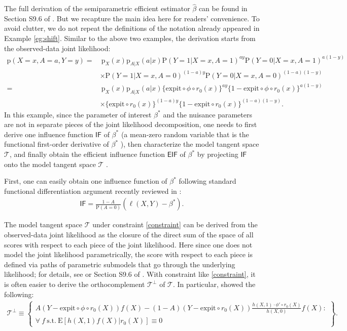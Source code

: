\documentclass{article}
\def\IIF{\mathsf{IF}}
\def\expit{\mathrm{expit}}
\theoremstyle{plain}
\theoremstyle{definition}
\theoremstyle{remark}
\def\P{\mathrm{P}}
\def\E{\mathrm{E}}
\def\hat{\widehat}
\def\p{\mathrm{p}}
\def\st{\mathrm{s.t.}}
\begin{document}
The full derivation of the semiparametric efficient estimator $\hat{\beta}$ can be found in Section S9.6 of \citet{qiu2023efficient}. But we recapture the main idea here for readers' convenience. To avoid clutter, we do not repeat the definitions of the notation already appeared in Example \ref{eg:shift}. Similar to the above two examples, the derivation starts from the observed-data joint likelihood:
\begin{align*}
\p (X = x, A = a, Y = y) = & \ \p_{X} (x) \p_{A | X} (a | x) \P (Y = 1 | X = x, A = 1)^{a y} \P (Y = 0 | X = x, A = 1)^{a (1 - y)} \\
& \times \P (Y = 1 | X = x, A = 0)^{(1 - a) y} \P (Y = 0 | X = x, A = 0)^{(1 - a) (1 - y)} \\
= & \ \p_{X} (x) \p_{A | X} (a | x) \{\expit \circ \phi \circ r_{0} (x)\}^{a y} \{1 - \expit \circ \phi \circ r_{0} (x)\}^{a (1 - y)} \\
& \times \{\expit \circ r_{0} (x)\}^{(1 - a) y} \{1 - \expit \circ r_{0} (x)\}^{(1 - a) (1 - y)}.
\end{align*}
In this example, since the parameter of interest $\beta^\ast$ and the nuisance parameters are not in separate pieces of the joint likelihood decomposition, one needs to first derive one influence function $\mathsf{IF}$ of $\beta^\ast$ (a mean-zero random variable that is the functional first-order derivative of $\beta^\ast$ \citep{van2002part}), then characterize the model tangent space $\mathcal{T}$, and finally obtain the efficient influence function $\mathsf{EIF}$ of $\beta^\ast$ by projecting $\mathsf{IF}$ onto the model tangent space $\mathcal{T}$ \citep{van2003unified, tsiatis2007semiparametric}.

First, one can easily obtain one influence function of $\beta^\ast$ following standard functional differentiation argument recently reviewed in \citet{hines2022demystifying}:
\begin{align*}
\IIF = \frac{1 - A}{\P (A = 0)} (\ell (X, Y) - \beta^\ast).
\end{align*}

The model tangent space $\mathcal{T}$ under constraint \eqref{constraint} can be derived from the observed-data joint likelihood as the closure of the direct sum of the space of all scores with respect to each piece of the joint likelihood. Here since one does not model the joint likelihood parametrically, the score with respect to each piece is defined via paths of parametric submodels that go through the underlying likelihood; for details, see \citet{van2002part} or Section S9.6 of \citet{qiu2023efficient}. With constraint like \eqref{constraint}, it is often easier to derive the orthocomplement $\mathcal{T}^{\perp}$ of $\mathcal{T}$. In particular, \citet{qiu2023efficient} showed the following:
\begin{align*}
\mathcal{T}^{\perp} \equiv \left\{ \begin{array}{c}
A (Y - \expit \circ \phi \circ r_{0} (X)) f (X) - (1 - A) (Y - \expit \circ r_{0} (X)) \frac{h (X, 1) \cdot \phi' \circ r_{0} (X)}{h (X, 0)} f (X): \\
\forall \ f \ \st \ \E [h (X, 1) f (X) | r_{0} (X)] \equiv 0
\end{array} \right\}.
\end{align*}
\end{document}
